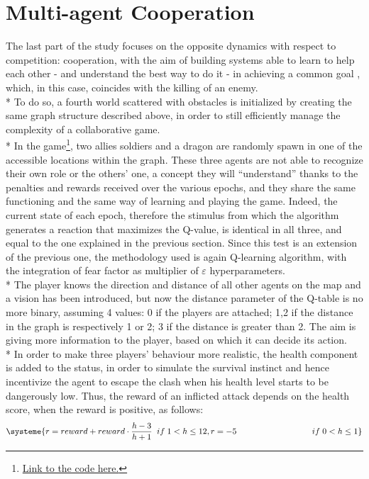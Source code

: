 \section{Multi-agent Cooperation}
The last part of the study focuses on the opposite dynamics with respect to competition: cooperation, with the aim of building systems able to learn to help each other - and understand the best way to do it - in achieving a common goal , which, in this case, coincides with the killing of an enemy.\\*
To do so, a fourth world scattered with obstacles is initialized by creating the same graph structure described above, in order to still efficiently manage the complexity of a collaborative game.\\*
In the game\footnote{\href{https://github.com/moiraghif/DragonHunting/tree/master/TeamWork}{Link to the code here.}}, two allies soldiers and a dragon are randomly spawn in one of the accessible locations within the graph. 
These three agents are not able to recognize their own role or the others' one, a concept they will ``understand'' thanks to the penalties and rewards received over the various epochs, and they share the same functioning and the same way of learning and playing the game. 
Indeed, the current state of each epoch, therefore the stimulus from which the algorithm generates a reaction that maximizes the Q-value, is identical in all three, and equal to the one explained in the previous section. Since this test is an extension of the previous one, the methodology used is again Q-learning algorithm, with the integration of fear factor as multiplier of $\varepsilon$ hyperparameters. \\*
The player knows the direction and distance of all other agents on the map and a vision has been introduced, but now the distance parameter of the Q-table is no more binary, assuming 4 values: 0 if the players are attached; 1,2 if the distance in the graph is respectively 1 or 2; 3 if the distance is greater than 2. The aim is giving more information to the player, based on which it can decide its action.\\*
In order to make three players' behaviour more realistic, the health component is added to the status, in order to simulate the survival instinct and hence incentivize the agent to escape the clash when his health level starts to be dangerously low. Thus, the reward of an inflicted attack depends on the health score, when the reward is positive, as follows:
\[
\systeme{r = reward+reward\cdot\frac{h-3}{h+1}\;\;if\;1<h\leq 12, r = -5\qquad\qquad\qquad\qquad\quad if\;0<h\leq 1}
\]
